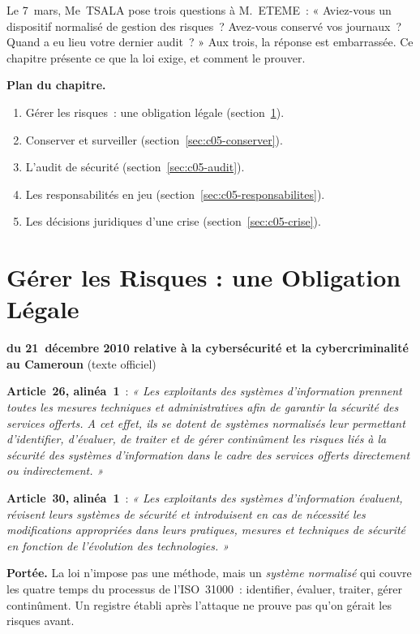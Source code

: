 Le 7~mars, Me~TSALA pose trois questions à M.~ETEME~: « Aviez-vous un
dispositif normalisé de gestion des risques~? Avez-vous conservé vos
journaux~? Quand a eu lieu votre dernier audit~? » Aux trois, la réponse
est embarrassée. Ce chapitre présente ce que la loi exige, et comment le
prouver.

\medskip
\textbf{Plan du chapitre.}
\begin{enumerate}
    \item Gérer les risques~: une obligation légale (section~\ref{sec:c05-risques}).
    \item Conserver et surveiller (section~\ref{sec:c05-conserver}).
    \item L'audit de sécurité (section~\ref{sec:c05-audit}).
    \item Les responsabilités en jeu (section~\ref{sec:c05-responsabilites}).
    \item Les décisions juridiques d'une crise (section~\ref{sec:c05-crise}).
\end{enumerate}

\separateur

\section{Gérer les Risques : une Obligation Légale}
\label{sec:c05-risques}

\begin{boxjuris}
\textbf{ du 21~décembre 2010 relative à la
cybersécurité et la cybercriminalité au Cameroun} (texte officiel)

\medskip
\textbf{Article~26, alinéa~1}~: \textit{« Les exploitants des systèmes
d'information prennent toutes les mesures techniques et administratives
afin de garantir la sécurité des services offerts. A cet effet, ils se
dotent de systèmes normalisés leur permettant d'identifier, d'évaluer, de
traiter et de gérer continûment les risques liés à la sécurité des
systèmes d'information dans le cadre des services offerts directement ou
indirectement. »}

\medskip
\textbf{Article~30, alinéa~1}~: \textit{« Les exploitants des systèmes
d'information évaluent, révisent leurs systèmes de sécurité et
introduisent en cas de nécessité les modifications appropriées dans leurs
pratiques, mesures et techniques de sécurité en fonction de l'évolution
des technologies. »}

\medskip
\textbf{Portée.} La loi n'impose pas une méthode, mais un \emph{système
normalisé} qui couvre les quatre temps du processus de l'ISO~31000~:
identifier, évaluer, traiter, gérer continûment. Un registre établi après
l'attaque ne prouve pas qu'on gérait les risques avant.
\end{boxjuris}

